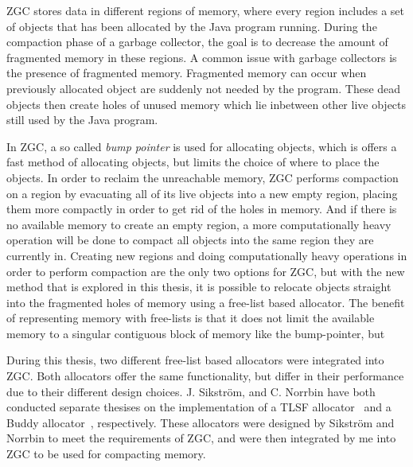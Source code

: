 ZGC stores data in different regions of memory, where every region includes a set of objects that has been allocated by the Java program running. During the compaction phase of a garbage collector, the goal is to decrease the amount of fragmented memory in these regions. A common issue with garbage collectors is the presence of fragmented memory. Fragmented memory can occur when previously allocated object are suddenly not needed by the program. These dead objects then create holes of unused memory which lie inbetween other live objects still used by the Java program. 

In ZGC, a so called \textit{bump pointer} is used for allocating objects, which is offers a fast method of allocating objects, but limits the choice of where to place the objects. In order to reclaim the unreachable memory, ZGC performs compaction on a region by evacuating all of its live objects into a new empty region, placing them more compactly in order to get rid of the holes in memory. And if there is no available memory to create an empty region, a more computationally heavy operation will be done to compact all objects into the same region they are currently in. Creating new regions and doing computationally heavy operations in order to perform compaction are the only two options for ZGC, but with the new method that is explored in this thesis, it is possible to relocate objects straight into the fragmented holes of memory using a free-list based allocator. The benefit of representing memory with free-lists is that it does not limit the available memory to a singular contiguous block of memory like the bump-pointer, but 

During this thesis, two different free-list based allocators were integrated into ZGC. Both allocators offer the same functionality, but differ in their performance due to their different design choices. J. Sikström, and C. Norrbin have both conducted separate thesises on the implementation of a TLSF allocator~\cite{JOELS:TODO} and a Buddy allocator~\cite{CASPERS:TODO}, respectively. These allocators were designed by Sikström and Norrbin to meet the requirements of ZGC, and were then integrated by me into ZGC to be used for compacting memory. 